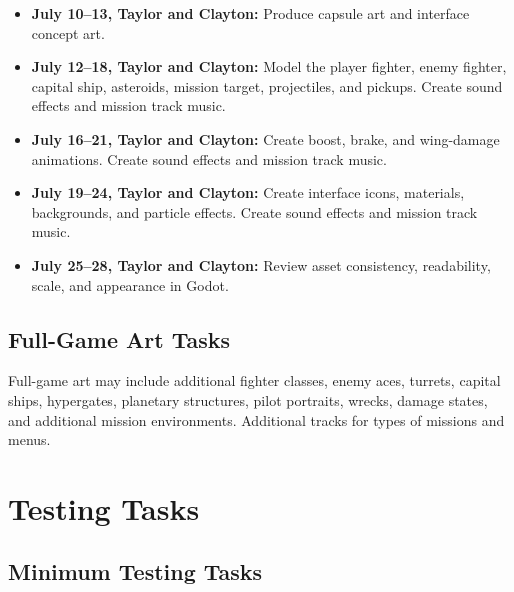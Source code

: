 \documentclass[journal]{IEEEtran}
\begin{document}
\begin{itemize}

    \item \textbf{July 10--13, Taylor and Clayton:}
    Produce capsule art and interface concept art.

    \item \textbf{July 12--18, Taylor and Clayton:}
    Model the player fighter, enemy fighter, capital ship, asteroids, mission target, projectiles, and pickups. Create sound effects and mission track music.

    \item \textbf{July 16--21, Taylor and Clayton:}
    Create boost, brake, and wing-damage animations. Create sound effects and mission track music.

    \item \textbf{July 19--24, Taylor and Clayton:}
    Create interface icons, materials, backgrounds, and particle effects. Create sound effects and mission track music.

    \item \textbf{July 25--28, Taylor and Clayton:}
    Review asset consistency, readability, scale, and appearance in Godot. 

\end{itemize}


\subsection{Full-Game Art Tasks}

Full-game art may include additional fighter classes, enemy aces, turrets, capital ships, hypergates, planetary structures, pilot portraits, wrecks, damage states, and additional mission environments. Additional tracks for types of missions and menus.

\section{Testing Tasks}

\subsection{Minimum Testing Tasks}
\end{document}
